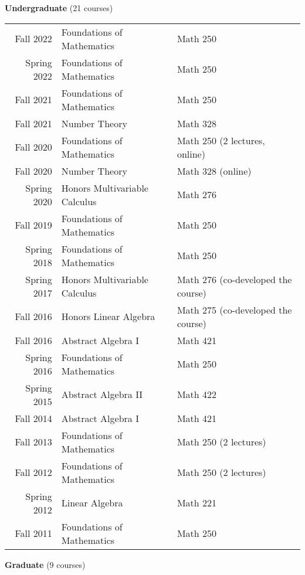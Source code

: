 \documentclass[margin,line]{res}
\newcommand{\defi}[1]{\textsf{#1}} 				%
\begin{document}
\begin{resume}
{\bf Undergraduate} (21 courses)
\vspace*{-.1in}

\begin{tabular}{rll}
 Fall 2022 & \defi{Foundations of Mathematics} & Math 250\\  
 Spring 2022 & \defi{Foundations of Mathematics} & Math 250\\
 Fall 2021 & \defi{Foundations of Mathematics} & Math 250  \\
 Fall 2021 & \defi{Number Theory} & Math 328   \\   
 Fall 2020 & \defi{Foundations of Mathematics} & Math 250 (2 lectures, online) \\
 Fall 2020 & \defi{Number Theory} & Math 328 (online)  \\    
 Spring 2020 & \defi{Honors Multivariable Calculus} & Math 276 \\
 Fall 2019 & \defi{Foundations of Mathematics} & Math 250 \\
 Spring 2018 & \defi{Foundations of Mathematics} & Math 250 \\
 Spring 2017 & \defi{Honors Multivariable Calculus} & Math 276  (co-developed the course) \\
 Fall 2016 & \defi{Honors Linear Algebra} & Math 275 (co-developed the course) \\
 Fall 2016 & \defi{Abstract Algebra I} & Math 421 \\
 Spring 2016 & \defi{Foundations of Mathematics} & Math 250 \\
 Spring 2015 & \defi{Abstract Algebra II} & Math 422 \\
 Fall 2014 & \defi{Abstract Algebra I} & Math 421 \\
 Fall 2013 & \defi{Foundations of Mathematics} & Math 250 (2 lectures) \\
 Fall 2012 & \defi{Foundations of Mathematics} & Math 250 (2 lectures) \\
 Spring 2012 & \defi{Linear Algebra} & Math 221 \\
 Fall 2011 & \defi{Foundations of Mathematics} & Math 250 \\
\end{tabular}

{\bf Graduate} (9 courses)
  \vspace*{-.1in}


\end{resume}
\end{document}
